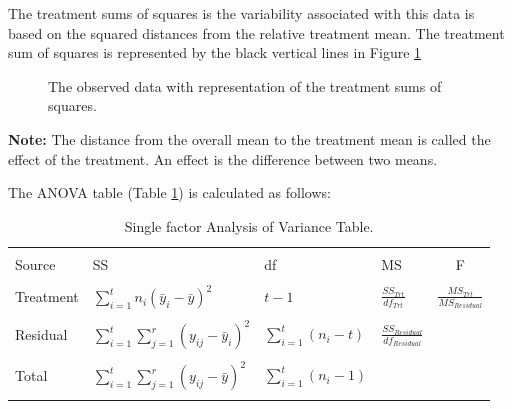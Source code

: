 \documentclass[a4paper, 10pt, fleqn, twosided]{memoir}
\begin{document}
The treatment sums of squares is the variability associated with this data is based on the squared distances from the
relative treatment mean. The treatment sum of squares is represented by the black vertical lines in Figure
\ref{fig:hypcrdtrtss}

\begin{figure}[!hbtp]
\centering
{}
\caption{The observed data with representation of the treatment sums of squares.}
\label{fig:hypcrdtrtss}
\end{figure}
\textbf{Note:} The distance from the overall mean to the treatment mean is called the effect of the treatment. An
effect is the difference between two means.


The ANOVA table (Table \ref{tab:crdaov}) is calculated as follows:

\begin{table}[ht]
\centering
\begin{tabular}{llllc}
\toprule
   & & & &\\
  Source & SS & df & MS & F \\
   & & & &\\
\midrule
   Treatment & $\sum\limits_{i=1}^{t}n_i(\bar{y}_{i}-\bar{y})^2$ & $t-1$ & $\frac{SS_{Trt}}{df_{Trt}}$ & $\frac{MS_{Trt}}{MS_{Residual}}$ \\
   & & & &\\
  Residual & $\sum\limits_{i=1}^{t} \sum\limits_{j=1}^{r} (y_{ij}-\bar{y}_{i})^2$ & $\sum\limits_{i=1}^{t}(n_i-t)$ & $\frac{SS_{Residual}}{df_{Residual}}$ &  \\
   & & & &\\
   Total & $\sum\limits_{i=1}^{t} \sum\limits_{j=1}^{r} (y_{ij}-\bar{y})^2 $ & $\sum\limits_{i=1}^{t}(n_i-1)$ &  &  \\
   & & & &\\
\bottomrule
\end{tabular}
\caption{\label{tab:crdaov} Single factor Analysis of Variance Table.}
\end{table}
\end{document}
